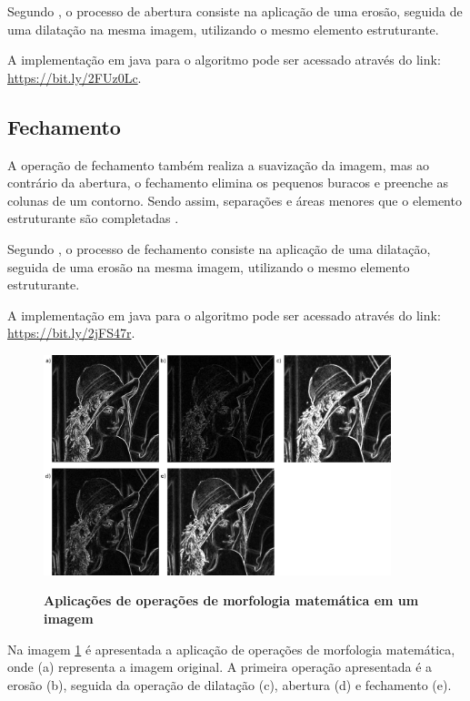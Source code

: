\documentclass[
	12pt,				%
	oneside,			%
	a4paper,			%
	english,			%
	french,				%
	spanish,			%
	brazil,				%
	]{abntex2}
\begin{document}
Segundo \citet{pedriniSchwartz:2008}, o processo de abertura consiste na aplicação de uma erosão, seguida de uma dilatação na mesma imagem, utilizando o mesmo elemento estruturante.

A implementação em java para o algoritmo pode ser acessado através do link: \url{https://bit.ly/2FUz0Lc}.

\subsection{Fechamento}

A operação de fechamento também realiza a suavização da imagem, mas ao contrário da abertura, o fechamento elimina os pequenos buracos e preenche as colunas de um contorno. Sendo assim, separações e áreas menores que o elemento estruturante são completadas \cite{gonzalesWoods:2008}.

Segundo \citet{pedriniSchwartz:2008}, o processo de fechamento consiste na aplicação de uma dilatação, seguida de uma erosão na mesma imagem, utilizando o mesmo elemento estruturante.

A implementação em java para o algoritmo pode ser acessado através do link: \url{https://bit.ly/2jFS47r}.

\begin{figure}[ht]
\centering
\caption{\textbf{Aplicações de operações de morfologia matemática em um imagem}}
\includegraphics[width=0.9\textwidth]{imagens/morfologia.png}
\sourceAuthor
\label{fig:morfologia}
\end{figure}

Na imagem \ref{fig:morfologia} é apresentada a aplicação de operações de morfologia matemática, onde (a) representa a imagem original. A primeira operação apresentada é a erosão (b), seguida da operação de dilatação (c), abertura (d) e fechamento (e).
    
\end{document}
